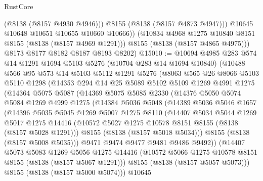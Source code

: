 \begin{lexlean}{RustCore}
\begin{coremodule}
                (@8138 (@8157 @4930 @4946)))
              @8155
              (@8138 (@8157 @4873 @4947)))
            @10645
            @10648
            @10651
            @10655
            @10660
            @10666))
        (@10834 @4968 @1275 @10840 @8151 @8155 (@8138 (@8157 @4969 @1291)))
        @8155
        (@8138 (@8157 @4865 @4975)))
      @8173
      @8177
      @8182
      @8187
      @8193
      @8202)
@15010 := @10694
    @4985
    @283
    @574
    @14
    @1291
    @1694
    @5103
    @5276
    (@10704 @283 @14 @1694 @10840)
    (@10488
      @566
      @95
      @573
      @14
      @5103
      @5112
      @1291
      @5276
      (@8063
        @565
        @26
        @8066
        @5103
        @5110
        @1298
        (@14353
          @294
          @14
          @25
          @5089
          @5102
          @5109
          @1269
          @4991
          @1275
          (@14364
            @5075
            @5087
            (@14369
              @5075
              @5085
              @2330
              (@14376
                @5050
                @5074
                @5084
                @1269
                @4999
                @1275
                (@14384
                  @5036
                  @5048
                  (@14389
                    @5036
                    @5046
                    @1657
                    (@14396
                      @5035
                      @5045
                      @1269
                      @5007
                      @1275
                      @8110
                      (@14407
                        @5034
                        @5044
                        @1269
                        @5017
                        @1275
                        @14416
                        (@10572 @5027 @1275 @10578 @8151 @8155 (@8138 (@8157 @5028 @1291)))
                        @8155
                        (@8138 (@8157 @5018 @5034)))
                      @8155
                      (@8138 (@8157 @5008 @5035)))
                    @9471
                    @9474
                    @9477
                    @9481
                    @9486
                    @9492))
                (@14407
                  @5073
                  @5083
                  @1269
                  @5056
                  @1275
                  @14416
                  (@10572 @5066 @1275 @10578 @8151 @8155 (@8138 (@8157 @5067 @1291)))
                  @8155
                  (@8138 (@8157 @5057 @5073)))
                @8155
                (@8138 (@8157 @5000 @5074)))
              @10645

\end{coremodule}
\end{lexlean}
